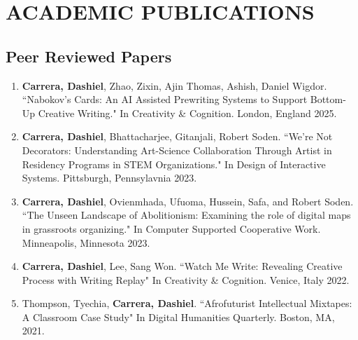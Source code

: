 \section{ACADEMIC PUBLICATIONS}

\subsection{Peer Reviewed Papers}
 \begin{enumerate}
  
   
  \item \textbf{Carrera, Dashiel}, Zhao, Zixin, Ajin Thomas, Ashish, Daniel Wigdor. ``Nabokov's Cards: An AI Assisted Prewriting Systems to Support Bottom-Up Creative Writing." In Creativity \& Cognition. London, England 2025. \\
  \item \textbf{Carrera, Dashiel}, Bhattacharjee, Gitanjali, Robert Soden. ``We're Not Decorators: Understanding Art-Science Collaboration Through Artist in Residency Programs in STEM Organizations." In Design of Interactive Systems. Pittsburgh, Pennsylavnia 2023. \\
  \item \textbf{Carrera, Dashiel}, Ovienmhada, Ufuoma, Hussein, Safa, and Robert Soden. ``The Unseen Landscape of Abolitionism: Examining the role of digital maps in
grassroots organizing."  In Computer Supported Cooperative Work. Minneapolis, Minnesota 2023.\\
  \item \textbf{Carrera, Dashiel}, Lee, Sang Won. ``Watch Me Write: Revealing Creative Process with Writing Replay" In Creativity \& Cognition. Venice, Italy 2022. \\
  \item Thompson, Tyechia, \textbf{Carrera, Dashiel}. ``Afrofuturist Intellectual Mixtapes: A Classroom Case Study" In Digital Humanities Quarterly. Boston, MA, 2021.\
 \end{enumerate}

